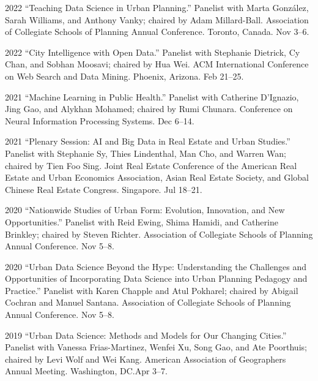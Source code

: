 \documentclass[11pt,letterpaper]{report}
\begin{document}
    \begin{tablist}

        \item[2022] \tab{}\enquote{Teaching Data Science in Urban Planning.} Panelist with Marta Gonz{\'a}lez, Sarah Williams, and Anthony Vanky; chaired by Adam Millard-Ball. Association of Collegiate Schools of Planning Annual Conference. Toronto, Canada. Nov 3--6.

        \item[2022] \tab{}\enquote{City Intelligence with Open Data.} Panelist with Stephanie Dietrick, Cy Chan, and Sobhan Moosavi; chaired by Hua Wei. ACM International Conference on Web Search and Data Mining. Phoenix, Arizona. Feb 21--25.

        \item[2021] \tab{}\enquote{Machine Learning in Public Health.} Panelist with Catherine D'Ignazio, Jing Gao, and Alykhan Mohamed; chaired by Rumi Chunara. Conference on Neural Information Processing Systems. Dec 6--14.

        \item[2021] \tab{}\enquote{Plenary Session: AI and Big Data in Real Estate and Urban Studies.} Panelist with Stephanie Sy, Thies Lindenthal, Man Cho, and Warren Wan; chaired by Tien Foo Sing. Joint Real Estate Conference of the American Real Estate and Urban Economics Association, Asian Real Estate Society, and Global Chinese Real Estate Congress. Singapore. Jul 18--21.

        \item[2020] \tab{}\enquote{Nationwide Studies of Urban Form: Evolution, Innovation, and New Opportunities.} Panelist with Reid Ewing, Shima Hamidi, and Catherine Brinkley; chaired by Steven Richter. Association of Collegiate Schools of Planning Annual Conference. Nov 5--8.

        \item[2020] \tab{}\enquote{Urban Data Science Beyond the Hype: Understanding the Challenges and Opportunities of Incorporating Data Science into Urban Planning Pedagogy and Practice.} Panelist with Karen Chapple and Atul Pokharel; chaired by Abigail Cochran and Manuel Santana. Association of Collegiate Schools of Planning Annual Conference. Nov 5--8.

        \item[2019] \tab{}\enquote{Urban Data Science: Methods and Models for Our Changing Cities.} Panelist with Vanessa Frias-Martinez, Wenfei Xu, Song Gao, and Ate Poorthuis; chaired by Levi Wolf and Wei Kang. American Association of Geographers Annual Meeting. Washington, DC.\@ Apr 3--7.


\end{tablist}
\end{document}
